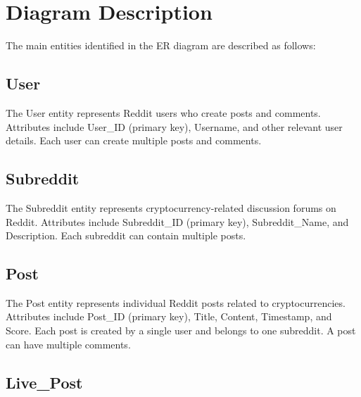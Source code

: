 \section{Diagram Description}

The main entities identified in the ER diagram are described as follows:

\subsection{User}

The User entity represents Reddit users who create posts and comments. Attributes include User\_ID (primary key), Username, and other relevant user details. Each user can create multiple posts and comments.

\subsection{Subreddit}

The Subreddit entity represents cryptocurrency-related discussion forums on Reddit. Attributes include Subreddit\_ID (primary key), Subreddit\_Name, and Description. Each subreddit can contain multiple posts.

\subsection{Post}

The Post entity represents individual Reddit posts related to cryptocurrencies. Attributes include Post\_ID (primary key), Title, Content, Timestamp, and Score. Each post is created by a single user and belongs to one subreddit. A post can have multiple comments.

\subsection{Live\_Post}

